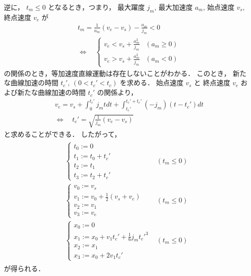 \documentclass[a5paper]{ltjsarticle}
\begin{document}
逆に， $t_m \leq 0$ となるとき，つまり，
最大躍度 $j_m$, 最大加速度 $a_m$, 始点速度 $v_s$, 終点速度 $v_e$ が
\begin{align}
     &
    t_m = \frac{1}{a_m}(v_e-v_s) - \frac{a_m}{j_m} < 0
    \\
     &
    \Leftrightarrow
    \quad
    \left\{
    \begin{array}{ll}
        v_e < v_s + \frac{a_m^2}{j_m} & (a_m \ge 0)
        \\
        v_e > v_s + \frac{a_m^2}{j_m} & (a_m <0)
    \end{array}
    \right.
\end{align}
の関係のとき，等加速度直線運動は存在しないことがわかる．
このとき，
新たな曲線加速の時間 $t_c',~(0 < t_c' < t_c)$ を求める．
始点速度 $v_s$ と 終点速度 $v_e$ および新たな曲線加速の時間 $t_c'$ の関係より，
\begin{align}
     &
    v_e = v_s + \int_{0}^{t_c'} j_m t dt + \int_{t_c'}^{t_c'+t_c'} (-j_m) (t-t_c') dt
    \\
     &
    \Leftrightarrow\quad
    t_c' = \sqrt{\frac{1}{j_m}(v_e-v_s)}
\end{align}
と求めることができる．
したがって，
\begin{align}
    \begin{array}{ll}
        \left\{ \begin{array}{l}
            t_0 := 0          \\
            t_1 := t_0 + t_c' \\
            t_2 := t_1        \\
            t_3 := t_2 + t_c'
        \end{array} \right.
         &
        (t_m \leq 0)
        \\
        \left\{ \begin{array}{l}
            v_0 := v_s                                     \\
            v_1 := v_0 + \frac{1}{2}\left( v_s+v_e \right) \\
            v_2 := v_1                                     \\
            v_3 := v_e
        \end{array} \right.
         &
        (t_m \leq 0)
        \\
        \left\{ \begin{array}{l}
            x_0 := 0                                       \\
            x_1 := x_0 + v_1 t_c' + \frac{1}{6} j_m t_c'^3 \\
            x_2 := x_1                                     \\
            x_3 := x_0 + 2 v_1 t_c'
        \end{array} \right.
         &
        (t_m \leq 0)
    \end{array}
\end{align}
が得られる．
\end{document}
